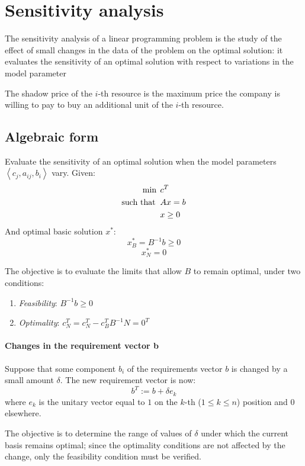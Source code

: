 \section{Sensitivity analysis}

The sensitivity analysis of a linear programming problem is the study of the effect of small changes in the data of the problem on the optimal solution: it evaluates the sensitivity of an optimal solution with respect to variations in the model parameter
\begin{definition}
    The shadow price of the $i$-th resource is the maximum price the company is willing to pay to buy an additional unit of the $i$-th resource.
\end{definition}

\subsection*{Algebraic form}
Evaluate the sensitivity of an optimal solution when the model parameters $\left\langle c_j, a_{ij}, b_i \right\rangle $ vary.
Given: 
\begin{align*}
    \min                      \:&\: c^T            \\
    \textnormal{such that }     &\: Ax = b         \\
                                &\: x \geq 0
\end{align*}
And optimal basic solution $x^{*}$: 
\[x^{*}_B=B^{-1}b \geq 0\]
\[x^{*}_N=0\]

The objective is to evaluate the limits that allow $B$ to remain optimal, under two conditions:
\begin{enumerate}
  \item \textit{Feasibility}: $B^{-1} b \geq 0$
  \item \textit{Optimality}: $c_N^T = c_N^T - c_B^T B^{-1} N = 0^T$
\end{enumerate}

\paragraph*{Changes in the requirement vector b}
Suppose that some component $b_i$ of the requirements vector $b$ is changed by a small amount $\delta$.
The new requirement vector is now:
\[ b^T := b + \delta e_k \]
where $e_k$ is the unitary vector equal to $1$ on the $k$-th ($1 \leq k \leq n$) position and $0$ elsewhere.

The objective is to determine the range of values of $\delta$ under which the current basis remains optimal;
since the optimality conditions are not affected by the change, only the feasibility condition must be verified.

